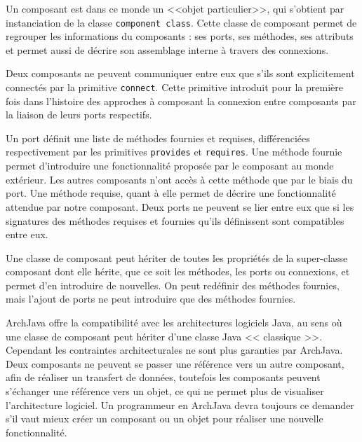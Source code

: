       Un composant est dans ce monde un <<objet particulier>>, qui s'obtient par instanciation de la classe \texttt{component class}. Cette classe de composant permet de regrouper les informations du composants : ses ports, ses méthodes, ses attributs et permet aussi de décrire son assemblage interne à travers des connexions.
      
  Deux composants ne peuvent communiquer entre eux que s'ils sont explicitement connectés par la primitive \texttt{connect}. Cette primitive introduit pour la première fois dans l'histoire des approches à composant la connexion entre composants par la liaison de leurs ports respectifs. 
  
 Un port définit une liste de méthodes fournies et requises, différenciées respectivement par les primitives \texttt{provides} et \texttt{requires}. Une méthode fournie permet d'introduire une fonctionnalité proposée par le composant au monde extérieur. Les autres composants n'ont accès à cette méthode que par le biais du port. Une méthode requise, quant à elle permet de décrire une fonctionnalité attendue par notre composant. Deux ports ne peuvent se lier entre eux que si les signatures des méthodes requises et fournies qu'ils définissent sont compatibles entre eux.  
      
Une classe de composant peut hériter de toutes les propriétés de la super-classe composant dont elle hérite, que ce soit les méthodes, les ports ou connexions, et permet d'en introduire de nouvelles. On peut redéfinir des méthodes fournies, mais l'ajout de ports ne peut introduire que des méthodes fournies.

  ArchJava offre la compatibilité avec les architectures logiciels Java, au sens où une classe de composant peut hériter d'une classe Java << classique >>. Cependant les contraintes architecturales ne sont plus garanties par ArchJava. Deux composants ne peuvent se passer une référence vers un autre composant, afin de réaliser un transfert de données, toutefois les composants peuvent s'échanger une référence vers un objet, ce qui ne permet plus de visualiser l'architecture logiciel. Un programmeur en ArchJava devra toujours ce demander s'il vaut mieux créer un composant ou un objet pour réaliser une nouvelle fonctionnalité.

         


    
      
